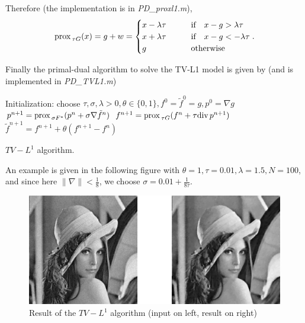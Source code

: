 \documentclass[letter,10pt]{article}
\def\Div{\textup{div\,}}
\def\prox{\textup{prox\,}}
\begin{document}
Therefore (the implementation is in \textit{PD\_proxl1.m}),
$$\prox_{\tau G}(x)=g+w=
\begin{cases}
x-\lambda\tau\qquad&\text{if}\quad x-g>\lambda\tau\\
x+\lambda\tau &\text{if}\quad x-g<-\lambda\tau\\
g&\text{otherwise}
\end{cases}.$$

Finally the primal-dual algorithm to solve the TV-L1 model is given by (and is implemented in \textit{PD\_TVL1.m})
\begin{algorithm}[H]
\begin{algorithmic}
\STATE Initialization: choose $\tau,\sigma,\lambda>0,\theta\in\{0,1\},f^0=\tilde{f}^0=g,p^0=\nabla g$
\REPEAT 
\STATE $p^{n+1}=\prox_{\sigma F^*}(p^n+\sigma \nabla\tilde{f}^n)$
\STATE $f^{n+1}=\prox_{\tau G}(f^n+\tau \Div p^{n+1})$
\STATE $\tilde{f}^{n+1}=f^{n+1}+\theta(f^{n+1}-f^n)$
\end{algorithmic}
\caption{$TV-L^1$ algorithm.}
\end{algorithm}
An example is given in the following figure with $\theta=1,\tau=0.01,\lambda=1.5,N=100$, and since here $\|\nabla\|<\frac{1}{8}$, we choose $\sigma=0.01+\frac{1}{8\tau}$.
\begin{figure}[H]
\centering\includegraphics[width=\textwidth]{tvl1.png}
\caption{Result of the $TV-L^1$ algorithm (input on left, result on right)}
\end{figure}
\end{document}
